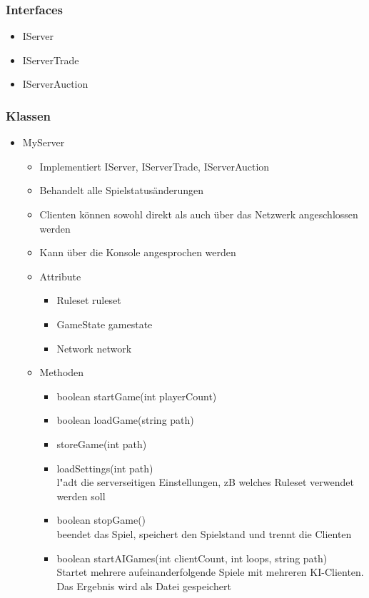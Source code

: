 \documentclass[a4paper,10pt]{article}
\begin{document}
\subsubsection{Interfaces}
\begin{itemize}
\item IServer
\item IServerTrade
\item IServerAuction
\end{itemize}

\subsubsection{Klassen}
\begin{itemize}
\item MyServer 
\begin{itemize}
\item Implementiert IServer, IServerTrade, IServerAuction
\item Behandelt alle Spielstatusänderungen
\item Clienten können sowohl direkt als auch über das Netzwerk angeschlossen werden
\item Kann über die Konsole angesprochen werden
\item Attribute
\begin{itemize}
\item Ruleset ruleset
\item GameState gamestate
\item Network network
\end{itemize}
\item Methoden
\begin{itemize}
\item boolean startGame(int playerCount) 
\item boolean loadGame(string path)
\item storeGame(int path)
\item loadSettings(int path)
\\l"adt die serverseitigen Einstellungen, zB welches Ruleset verwendet werden soll
\item boolean stopGame()
\\beendet das Spiel, speichert den Spielstand und trennt die Clienten
\item boolean startAIGames(int clientCount, int loops, string path)
\\Startet mehrere aufeinanderfolgende Spiele mit mehreren KI-Clienten. Das Ergebnis wird als Datei gespeichert
\end{itemize}
\end{itemize}
\end{itemize}
\end{document}
